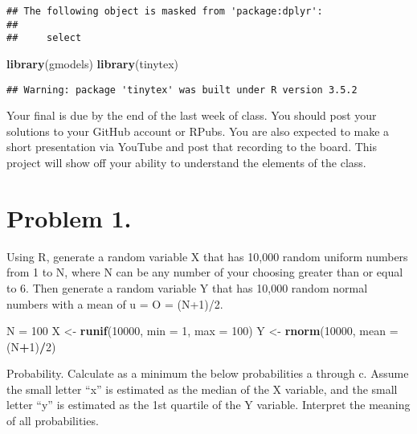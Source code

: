 \documentclass[]{article}
\newenvironment{Shaded}{\begin{snugshade}}{\end{snugshade}}
\newcommand{\KeywordTok}[1]{\textcolor[rgb]{0.13,0.29,0.53}{\textbf{#1}}}
\newcommand{\DataTypeTok}[1]{\textcolor[rgb]{0.13,0.29,0.53}{#1}}
\newcommand{\DecValTok}[1]{\textcolor[rgb]{0.00,0.00,0.81}{#1}}
\newcommand{\StringTok}[1]{\textcolor[rgb]{0.31,0.60,0.02}{#1}}
\newcommand{\OperatorTok}[1]{\textcolor[rgb]{0.81,0.36,0.00}{\textbf{#1}}}
\newcommand{\NormalTok}[1]{#1}
\begin{document}
\begin{verbatim}
## The following object is masked from 'package:dplyr':
## 
##     select
\end{verbatim}

\begin{Shaded}
\begin{Highlighting}[]
\KeywordTok{library}\NormalTok{(gmodels)}
\KeywordTok{library}\NormalTok{(tinytex)}
\end{Highlighting}
\end{Shaded}

\begin{verbatim}
## Warning: package 'tinytex' was built under R version 3.5.2
\end{verbatim}

Your final is due by the end of the last week of class. You should post
your solutions to your GitHub account or RPubs. You are also expected to
make a short presentation via YouTube and post that recording to the
board. This project will show off your ability to understand the
elements of the class.

\section{Problem 1.}\label{problem-1.}

Using R, generate a random variable X that has 10,000 random uniform
numbers from 1 to N, where N can be any number of your choosing greater
than or equal to 6. Then generate a random variable Y that has 10,000
random normal numbers with a mean of u = O = (N+1)/2.

\begin{Shaded}
\begin{Highlighting}[]
\NormalTok{N =}\StringTok{ }\DecValTok{100}
\NormalTok{X <-}\StringTok{ }\KeywordTok{runif}\NormalTok{(}\DecValTok{10000}\NormalTok{, }\DataTypeTok{min =} \DecValTok{1}\NormalTok{, }\DataTypeTok{max =} \DecValTok{100}\NormalTok{)}
\NormalTok{Y <-}\StringTok{ }\KeywordTok{rnorm}\NormalTok{(}\DecValTok{10000}\NormalTok{, }\DataTypeTok{mean =}\NormalTok{ (N}\OperatorTok{+}\DecValTok{1}\NormalTok{)}\OperatorTok{/}\DecValTok{2}\NormalTok{)}
\end{Highlighting}
\end{Shaded}

Probability. Calculate as a minimum the below probabilities a through c.
Assume the small letter ``x'' is estimated as the median of the X
variable, and the small letter ``y'' is estimated as the 1st quartile of
the Y variable. Interpret the meaning of all probabilities.
\end{document}
